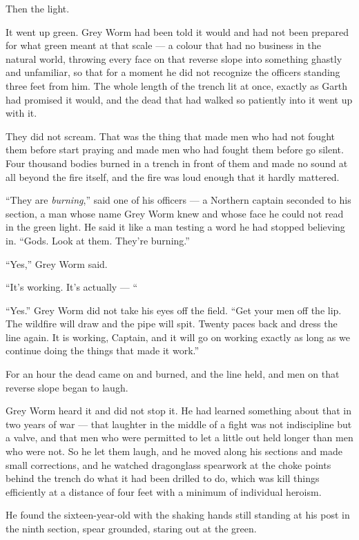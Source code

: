 Then the light.

It went up green. Grey Worm had been told it would and had not been prepared for what green meant at that scale — a colour that had no business in the natural world, throwing every face on that reverse slope into something ghastly and unfamiliar, so that for a moment he did not recognize the officers standing three feet from him. The whole length of the trench lit at once, exactly as Garth had promised it would, and the dead that had walked so patiently into it went up with it.

They did not scream. That was the thing that made men who had not fought them before start praying and made men who had fought them before go silent. Four thousand bodies burned in a trench in front of them and made no sound at all beyond the fire itself, and the fire was loud enough that it hardly mattered.

“They are \textit{burning},” said one of his officers — a Northern captain seconded to his section, a man whose name Grey Worm knew and whose face he could not read in the green light. He said it like a man testing a word he had stopped believing in. “Gods. Look at them. They’re burning.”

“Yes,” Grey Worm said.

“It’s working. It’s actually — “

“Yes.” Grey Worm did not take his eyes off the field. “Get your men off the lip. The wildfire will draw and the pipe will spit. Twenty paces back and dress the line again. It is working, Captain, and it will go on working exactly as long as we continue doing the things that made it work.”

\sceneBreak

For an hour the dead came on and burned, and the line held, and men on that reverse slope began to laugh.

Grey Worm heard it and did not stop it. He had learned something about that in two years of war — that laughter in the middle of a fight was not indiscipline but a valve, and that men who were permitted to let a little out held longer than men who were not. So he let them laugh, and he moved along his sections and made small corrections, and he watched dragonglass spearwork at the choke points behind the trench do what it had been drilled to do, which was kill things efficiently at a distance of four feet with a minimum of individual heroism.

He found the sixteen-year-old with the shaking hands still standing at his post in the ninth section, spear grounded, staring out at the green.

